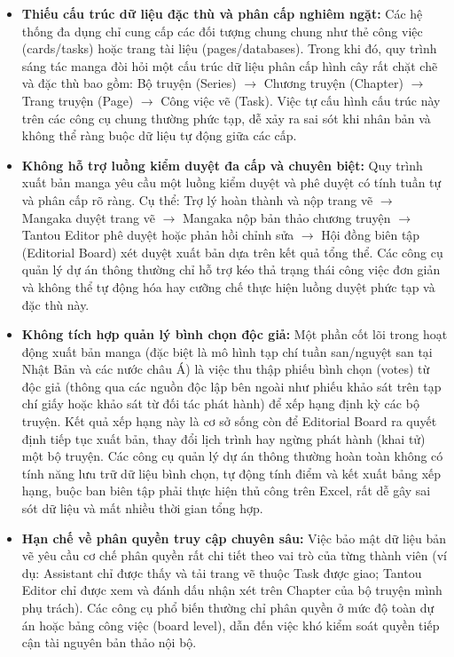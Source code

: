 \begin{itemize}
    \item \textbf{Thiếu cấu trúc dữ liệu đặc thù và phân cấp nghiêm ngặt:} Các hệ thống đa dụng chỉ cung cấp các đối tượng chung chung như thẻ công việc (cards/tasks) hoặc trang tài liệu (pages/databases). Trong khi đó, quy trình sáng tác manga đòi hỏi một cấu trúc dữ liệu phân cấp hình cây rất chặt chẽ và đặc thù bao gồm: Bộ truyện (Series) $\rightarrow$ Chương truyện (Chapter) $\rightarrow$ Trang truyện (Page) $\rightarrow$ Công việc vẽ (Task). Việc tự cấu hình cấu trúc này trên các công cụ chung thường phức tạp, dễ xảy ra sai sót khi nhân bản và không thể ràng buộc dữ liệu tự động giữa các cấp.
    \item \textbf{Không hỗ trợ luồng kiểm duyệt đa cấp và chuyên biệt:} Quy trình xuất bản manga yêu cầu một luồng kiểm duyệt và phê duyệt có tính tuần tự và phân cấp rõ ràng. Cụ thể: Trợ lý hoàn thành và nộp trang vẽ $\rightarrow$ Mangaka duyệt trang vẽ $\rightarrow$ Mangaka nộp bản thảo chương truyện $\rightarrow$ Tantou Editor phê duyệt hoặc phản hồi chỉnh sửa $\rightarrow$ Hội đồng biên tập (Editorial Board) xét duyệt xuất bản dựa trên kết quả tổng thể. Các công cụ quản lý dự án thông thường chỉ hỗ trợ kéo thả trạng thái công việc đơn giản và không thể tự động hóa hay cưỡng chế thực hiện luồng duyệt phức tạp và đặc thù này.
    \item \textbf{Không tích hợp quản lý bình chọn độc giả:} Một phần cốt lõi trong hoạt động xuất bản manga (đặc biệt là mô hình tạp chí tuần san/nguyệt san tại Nhật Bản và các nước châu Á) là việc thu thập phiếu bình chọn (votes) từ độc giả (thông qua các nguồn độc lập bên ngoài như phiếu khảo sát trên tạp chí giấy hoặc khảo sát từ đối tác phát hành) để xếp hạng định kỳ các bộ truyện. Kết quả xếp hạng này là cơ sở sống còn để Editorial Board ra quyết định tiếp tục xuất bản, thay đổi lịch trình hay ngừng phát hành (khai tử) một bộ truyện. Các công cụ quản lý dự án thông thường hoàn toàn không có tính năng lưu trữ dữ liệu bình chọn, tự động tính điểm và kết xuất bảng xếp hạng, buộc ban biên tập phải thực hiện thủ công trên Excel, rất dễ gây sai sót dữ liệu và mất nhiều thời gian tổng hợp.
    \item \textbf{Hạn chế về phân quyền truy cập chuyên sâu:} Việc bảo mật dữ liệu bản vẽ yêu cầu cơ chế phân quyền rất chi tiết theo vai trò của từng thành viên (ví dụ: Assistant chỉ được thấy và tải trang vẽ thuộc Task được giao; Tantou Editor chỉ được xem và đánh dấu nhận xét trên Chapter của bộ truyện mình phụ trách). Các công cụ phổ biến thường chỉ phân quyền ở mức độ toàn dự án hoặc bảng công việc (board level), dẫn đến việc khó kiểm soát quyền tiếp cận tài nguyên bản thảo nội bộ.
\end{itemize}

